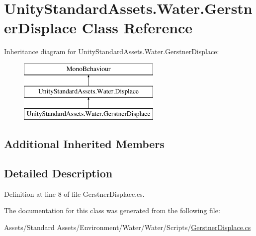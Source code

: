 \hypertarget{class_unity_standard_assets_1_1_water_1_1_gerstner_displace}{}\section{Unity\+Standard\+Assets.\+Water.\+Gerstner\+Displace Class Reference}
\label{class_unity_standard_assets_1_1_water_1_1_gerstner_displace}
Inheritance diagram for Unity\+Standard\+Assets.\+Water.\+Gerstner\+Displace\+:\begin{figure}[H]
\begin{center}
\leavevmode
\includegraphics[height=3.000000cm]{class_unity_standard_assets_1_1_water_1_1_gerstner_displace}
\end{center}
\end{figure}
\subsection*{Additional Inherited Members}


\subsection{Detailed Description}


Definition at line 8 of file Gerstner\+Displace.\+cs.



The documentation for this class was generated from the following file\+:\begin{DoxyCompactItemize}
\item 
Assets/\+Standard Assets/\+Environment/\+Water/\+Water/\+Scripts/\mbox{\hyperlink{_gerstner_displace_8cs}{Gerstner\+Displace.\+cs}}\end{DoxyCompactItemize}
